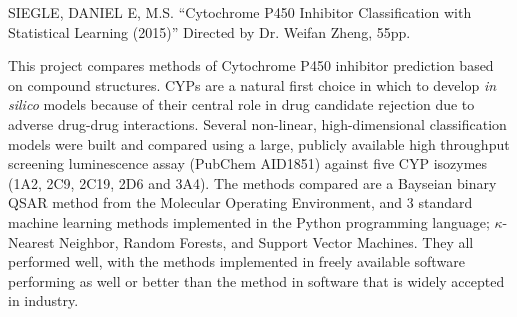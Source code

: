SIEGLE, DANIEL E, M.S.
``Cytochrome P450 Inhibitor Classification with Statistical Learning (2015)'' Directed by Dr. Weifan Zheng, 55pp.
\vspace{1cm}


This project compares methods of Cytochrome P450 inhibitor prediction based on compound structures. CYPs are a natural first choice in which to  develop \textit{in silico} models because of their central role in drug candidate rejection due to adverse drug-drug interactions. Several non-linear, high-dimensional classification models were built and compared using a large, publicly available high throughput screening luminescence assay (PubChem AID1851) against five CYP isozymes (1A2, 2C9, 2C19, 2D6 and 3A4). The methods compared are a Bayseian binary QSAR method from the Molecular Operating Environment, and 3 standard machine learning methods implemented in the Python programming language; $\kappa$-Nearest Neighbor, Random Forests, and Support Vector Machines. They all performed well, with the methods implemented in freely available software performing as well or better than the method in software that is widely accepted in industry. 